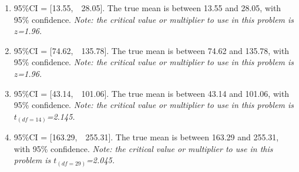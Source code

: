 \documentclass[12pt]{article}
\begin{document}
\begin{enumerate}
    \item 95\%CI = [13.55,\ \ 28.05]. The true mean is between 13.55 and 28.05, with 95\% confidence. \textit{Note: the critical value or multiplier to use in this problem is $z$=1.96.}
    \item 95\%CI = [74.62,\ \ 135.78]. The true mean is between 74.62 and 135.78, with 95\% confidence. \textit{Note: the critical value or multiplier to use in this problem is $z$=1.96.}
    \item 95\%CI = [43.14,\ \ 101.06]. The true mean is between 43.14 and 101.06, with 95\% confidence. \textit{Note: the critical value or multiplier to use in this problem is $t_{(df=14)}$=2.145.}
    \item 95\%CI = [163.29,\ \ 255.31]. The true mean is between 163.29 and 255.31, with 95\% confidence. \textit{Note: the critical value or multiplier to use in this problem is $t_{(df=29)}$=2.045.}
\end{enumerate}
\end{document}
